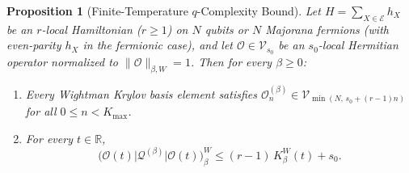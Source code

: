 \documentclass[11pt,a4paper]{article}
\numberwithin{equation}{section}
\theoremstyle{plain}
\newtheorem{proposition}[theorem]{Proposition}
\theoremstyle{definition}
\begin{document}
\begin{proposition}[Finite-Temperature $q$-Complexity Bound]\label{prop:q-complexity}
Let $H = \sum_{X\in\mathcal{E}} h_X$ be an $r$-local Hamiltonian ($r\ge 1$) on $N$ qubits or $N$ Majorana fermions (with even-parity $h_X$ in the fermionic case), and let $\mathcal{O}\in\mathcal{V}_{s_0}$ be an $s_0$-local Hermitian operator normalized to $\|\mathcal{O}\|_{\beta,W}=1$. Then for every $\beta\ge 0$:
\begin{enumerate}
  \setlength{\itemsep}{2pt}\setlength{\parskip}{0pt}
  \item[\emph{(1)}] Every Wightman Krylov basis element satisfies $\mathcal{O}_n^{(\beta)}\in\mathcal{V}_{\min(N,\,s_0+(r-1)n)}$ for all $0\le n < K_{\max}$.
  \item[\emph{(2)}] For every $t\in\mathbb{R}$,
  \begin{equation}\label{eq:q-complexity-bound}
    \bigl(\mathcal{O}(t)\big|\mathcal{Q}^{(\beta)}\big|\mathcal{O}(t)\bigr)_\beta^W
    \le (r-1)\,K_\beta^W(t) + s_0.
  \end{equation}
\end{enumerate}
\end{proposition}
\end{document}
